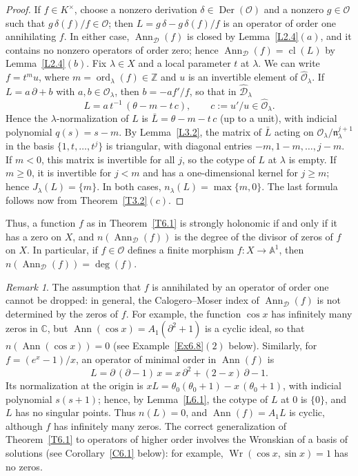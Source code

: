 \documentclass[11pt,reqno]{amsart}
\theoremstyle{plain}
\theoremstyle{definition}
\theoremstyle{remark}
\newtheorem*{remark}{Remark}
\numberwithin{equation}{section}
\newcommand{\cD}{\mathcal{D}}
\newcommand{\cO}{\mathcal{O}}
\newcommand{\C}{\mathbb{C}}
\newcommand{\Z}{\mathbb{Z}}
\newcommand{\A}{\mathbb{A}}
\newcommand{\del}{\partial}
\newcommand{\nl}{\mathfrak{n}_\lambda}
\newcommand{\hO}{\widehat{\cO}}
\newcommand{\hD}{\widehat{\cD}}
\DeclareMathOperator{\Ann}{Ann}
\DeclareMathOperator{\cl}{cl}
\DeclareMathOperator{\Der}{Der}
\DeclareMathOperator{\ord}{ord}
\DeclareMathOperator{\Wr}{Wr}
\begin{document}
\begin{proof}
If $f \in K^\times$, choose a nonzero derivation $\delta \in \Der(\cO)$ and a nonzero $g \in \cO$
such that $g\, \delta(f)/f \in \cO$; then $L = g\, \delta - g\, \delta(f)/f$ is an operator of
order one annihilating $f$. In either case, $\Ann_{\cD}(f)$ is closed by Lemma~\ref{L2.4}$(a)$,
and it contains no nonzero operators of order zero; hence $\Ann_{\cD}(f) = \cl(L)$ by
Lemma~\ref{L2.4}$(b)$. Fix $\lambda \in X$ and a local parameter $t$ at $\lambda$. We can write
$f = t^m u$, where $m = \ord_\lambda(f) \in \Z$ and $u$ is an invertible element of
$\hO_\lambda$. If $L = a\, \del + b$ with $a, b \in \cO_\lambda$, then $b = - a f'/f$, so that in
$\hD_\lambda$
\[
  L = a\, t^{-1}\, (\theta - m - t\, c) , \qquad c := u'/u \in \hO_\lambda .
\]
Hence the $\lambda$-normalization of $L$ is $\bar L = \theta - m - t\,c$ (up to a unit), with
indicial polynomial $q(s) = s - m$. By Lemma~\ref{L3.2}, the matrix of $\bar L$ acting on
$\cO_\lambda/\nl^{j+1}$ in the basis $\{1, t, \ldots, t^j\}$ is triangular, with diagonal entries
$-m, 1 - m, \ldots, j - m$. If $m < 0$, this matrix is invertible for all $j$, so the cotype of
$L$ at $\lambda$ is empty. If $m \ge 0$, it is invertible for $j < m$ and has a one-dimensional
kernel for $j \ge m$; hence $J_\lambda(L) = \{m\}$. In both cases, $n_\lambda(L) = \max\{m,
0\}$. The last formula follows now from Theorem~\ref{T3.2}$(c)$.
\end{proof}

Thus, a function $f$ as in Theorem~\ref{T6.1} is strongly holonomic if and only if it has a zero
on $X$, and $n(\Ann_{\cD}(f))$ is the degree of the divisor of zeros of $f$ on $X$. In particular,
if $f \in \cO$ defines a finite morphism $f: X \to \A^1$, then $n(\Ann_{\cD}(f)) = \deg(f)$.

\begin{remark}
The assumption that $f$ is annihilated by an operator of order one cannot be dropped: in general,
the Calogero--Moser index of $\Ann_{\cD}(f)$ is not determined by the zeros of $f$. For example,
the function $\cos x$ has infinitely many zeros in $\C$, but $\Ann(\cos x) = A_1 (\del^2 + 1)$ is
a cyclic ideal, so that $n(\Ann(\cos x)) = 0$ (see Example~\ref{Ex6.8}$(2)$ below). Similarly, for $f = (e^x - 1)/x$, an operator of minimal order in
$\Ann(f)$ is
\[
  L = \del\, (\del - 1)\, x = x\, \del^2 + (2 - x)\, \del - 1 .
\]
Its normalization at the origin is $x L = \theta_0 (\theta_0 + 1) - x\, (\theta_0 + 1)$, with
indicial polynomial $s (s+1)$; hence, by Lemma~\ref{L6.1}, the cotype of $L$ at $0$ is $\{0\}$, and
$L$ has no singular points. Thus $n(L) = 0$, and $\Ann(f) = A_1 L$ is cyclic, although $f$ has
infinitely many zeros. The correct generalization of Theorem~\ref{T6.1} to operators of higher
order involves the Wronskian of a basis of solutions (see Corollary~\ref{C6.1} below): for
example, $\Wr(\cos x, \sin x) = 1$ has no zeros.
\end{remark}
\end{document}
